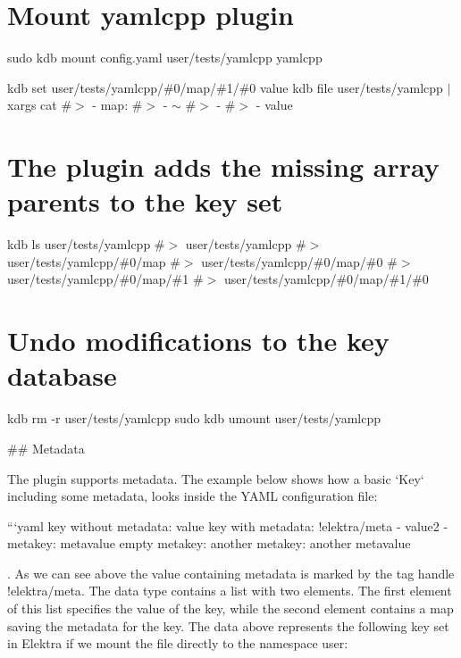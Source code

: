  \section*{Mount yamlcpp plugin}

sudo kdb mount config.\+yaml user/tests/yamlcpp yamlcpp

kdb set user/tests/yamlcpp/\#0/map/\#1/\#0 value kdb file user/tests/yamlcpp $\vert$ xargs cat \#$>$ -\/ map\+: \#$>$ -\/ $\sim$ \#$>$ -\/ \#$>$ -\/ value

\section*{The plugin adds the missing array parents to the key set}

kdb ls user/tests/yamlcpp \#$>$ user/tests/yamlcpp \#$>$ user/tests/yamlcpp/\#0/map \#$>$ user/tests/yamlcpp/\#0/map/\#0 \#$>$ user/tests/yamlcpp/\#0/map/\#1 \#$>$ user/tests/yamlcpp/\#0/map/\#1/\#0

\section*{Undo modifications to the key database}

kdb rm -\/r user/tests/yamlcpp sudo kdb umount user/tests/yamlcpp 
\begin{DoxyCode}
## Metadata

The plugin supports metadata. The example below shows how a basic `Key` including some metadata, looks
       inside the YAML configuration file:

```yaml
key without metadata: value
key with metadata: !elektra/meta
  - value2
  - metakey: metavalue
    empty metakey:
    another metakey: another metavalue
\end{DoxyCode}


. As we can see above the value containing metadata is marked by the tag handle {\ttfamily !elektra/meta}. The data type contains a list with two elements. The first element of this list specifies the value of the key, while the second element contains a map saving the metadata for the key. The data above represents the following key set in Elektra if we mount the file directly to the namespace {\ttfamily user}\+:

